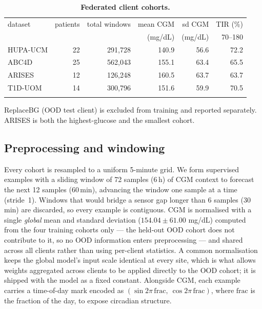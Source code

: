 \documentclass[10pt,letterpaper]{article}
\newlength\savedwidth
\newcommand\thickhline{\noalign{\global\savedwidth\arrayrulewidth\global\arrayrulewidth 2pt}%
\hline
\noalign{\global\arrayrulewidth\savedwidth}}
\begin{document}
\begin{table}[!ht]
\centering
\captionsetup{justification=centering,singlelinecheck=on}
\caption{\bf Federated client cohorts.}
\label{tab:datasets}
\begin{tabular}{lrrrrr}
\thickhline
dataset & patients & total windows & mean CGM & sd CGM & TIR (\%) \\
        &          &               & (mg/dL)  & (mg/dL) & 70--180  \\
\hline
HUPA-UCM & 22 & 291,728 & 140.9 & 56.6 & 72.2 \\
ABC4D    & 25 & 562,043 & 155.1 & 63.4 & 65.5 \\
ARISES   & 12 & 126,248 & 160.5 & 63.7 & 63.7 \\
T1D-UOM  & 14 & 300,796 & 151.6 & 59.9 & 70.5 \\
\thickhline
\end{tabular}
\begin{center}
{\small ReplaceBG (OOD test client) is excluded from training and reported
separately. ARISES is both the highest-glucose and the smallest cohort.}
\end{center}
\end{table}

\subsection*{Preprocessing and windowing}

Every cohort is resampled to a uniform 5-minute grid. We form supervised
examples with a sliding window of 72 samples (6\,h) of CGM context to forecast
the next 12 samples (60\,min), advancing the window one sample at a time
(stride~1). Windows that would bridge a sensor gap longer than 6 samples
(30\,min) are discarded, so every example is contiguous. CGM is normalised with
a single \emph{global} mean and standard deviation ($154.04 \pm 61.00$ mg/dL)
computed from the four training cohorts only --- the held-out OOD cohort does not
contribute to it, so no OOD information enters preprocessing --- and shared
across all clients rather than using per-client statistics. A common
normalisation keeps the global model's input scale identical at every site,
which is what allows weights aggregated across clients to be applied directly to
the OOD cohort; it is shipped with the model as a fixed constant. Alongside CGM,
each example carries a time-of-day mark encoded
as $(\sin 2\pi\,\mathrm{frac},\ \cos 2\pi\,\mathrm{frac})$, where $\mathrm{frac}$
is the fraction of the day, to expose circadian structure.
\end{document}
